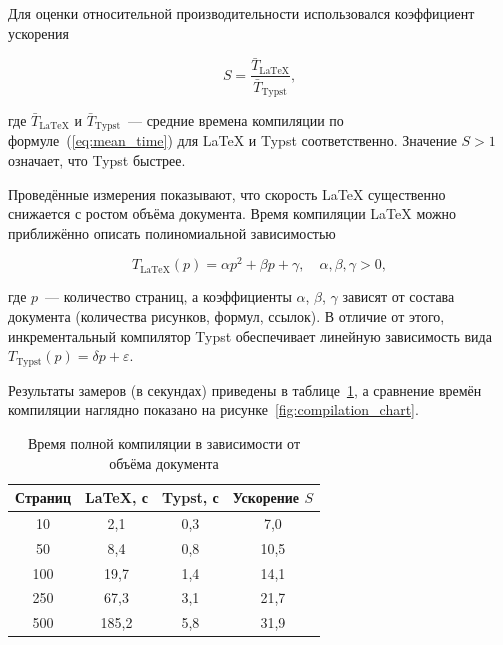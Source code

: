 Для оценки относительной производительности использовался коэффициент ускорения

\begin{equation}
    \label{eq:speedup}
    S = \frac{\bar{T}_{\text{LaTeX}}}{\bar{T}_{\text{Typst}}},
\end{equation}

\noindent где $\bar{T}_{\text{LaTeX}}$ и $\bar{T}_{\text{Typst}}$~--- средние времена компиляции по формуле~(\ref{eq:mean_time}) для {\LaTeX} и Typst соответственно. Значение $S > 1$ означает, что Typst быстрее.

Проведённые измерения показывают, что скорость {\LaTeX} существенно снижается с ростом объёма документа. Время компиляции {\LaTeX} можно приближённо описать полиномиальной зависимостью

\begin{equation}
    \label{eq:latex_complexity}
    T_{\text{LaTeX}}(p) = \alpha p^2 + \beta p + \gamma, \quad \alpha, \beta, \gamma > 0,
\end{equation}

\noindent где $p$~--- количество страниц, а коэффициенты $\alpha$, $\beta$, $\gamma$ зависят от состава документа (количества рисунков, формул, ссылок). В отличие от этого, инкрементальный компилятор Typst обеспечивает линейную зависимость вида $T_{\text{Typst}}(p) = \delta p + \varepsilon$.

Результаты замеров (в секундах) приведены в таблице~\ref{tab:compilation_times}, а сравнение времён компиляции наглядно показано на рисунке~\ref{fig:compilation_chart}.

\begin{table}[h!]
    \caption{Время полной компиляции в зависимости от объёма документа}
    \label{tab:compilation_times}
    \begin{center}
        \begin{tabular}{cccc}
            \toprule
            Страниц & {\LaTeX}, с & Typst, с & Ускорение $S$ \\
            \midrule
            10  & 2{,}1  & 0{,}3 & 7{,}0  \\
            50  & 8{,}4  & 0{,}8 & 10{,}5 \\
            100 & 19{,}7 & 1{,}4 & 14{,}1 \\
            250 & 67{,}3 & 3{,}1 & 21{,}7 \\
            500 & 185{,}2 & 5{,}8 & 31{,}9 \\
            \bottomrule
        \end{tabular}
    \end{center}
\end{table}

